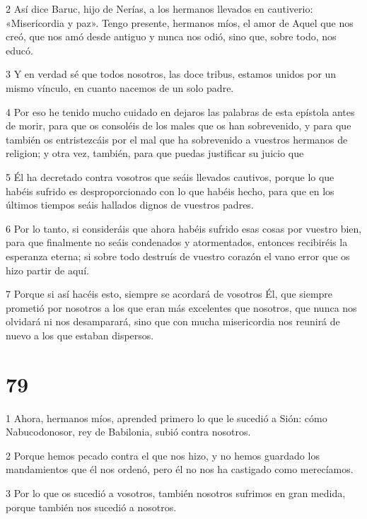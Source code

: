 \par 2 Así dice Baruc, hijo de Nerías, a los hermanos llevados en cautiverio: «Misericordia y paz». Tengo presente, hermanos míos, el amor de Aquel que nos creó, que nos amó desde antiguo y nunca nos odió, sino que, sobre todo, nos educó.

\par 3 Y en verdad sé que todos nosotros, las doce tribus, estamos unidos por un mismo vínculo, en cuanto nacemos de un solo padre.

\par 4 Por eso he tenido mucho cuidado en dejaros las palabras de esta epístola antes de morir, para que os consoléis de los males que os han sobrevenido, y para que también os entristezcáis por el mal que ha sobrevenido a vuestros hermanos de religion; y otra vez, también, para que puedas justificar su juicio que

\par 5 Él ha decretado contra vosotros que seáis llevados cautivos, porque lo que habéis sufrido es desproporcionado con lo que habéis hecho, para que en los últimos tiempos seáis hallados dignos de vuestros padres.

\par 6 Por lo tanto, si consideráis que ahora habéis sufrido esas cosas por vuestro bien, para que finalmente no seáis condenados y atormentados, entonces recibiréis la esperanza eterna; si sobre todo destruís de vuestro corazón el vano error que os hizo partir de aquí.

\par 7 Porque si así hacéis esto, siempre se acordará de vosotros Él, que siempre prometió por nosotros a los que eran más excelentes que nosotros, que nunca nos olvidará ni nos desamparará, sino que con mucha misericordia nos reunirá de nuevo a los que estaban dispersos.

\chapter{79}

\par 1 Ahora, hermanos míos, aprended primero lo que le sucedió a Sión: cómo Nabucodonosor, rey de Babilonia, subió contra nosotros.

\par 2 Porque hemos pecado contra el que nos hizo, y no hemos guardado los mandamientos que él nos ordenó, pero él no nos ha castigado como merecíamos.

\par 3 Por lo que os sucedió a vosotros, también nosotros sufrimos en gran medida, porque también nos sucedió a nosotros.

